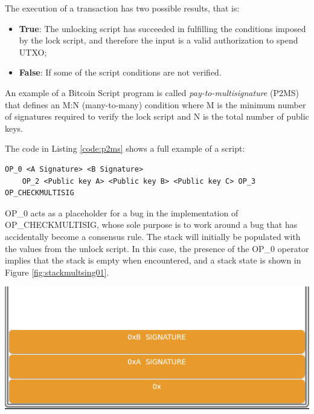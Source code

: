 The execution of a transaction has two possible results, that is: 

\begin{itemize}
    \item {\bf True}: The unlocking script has succeeded in fulfilling the 
        conditions imposed by the lock script, 
        and therefore the input is a valid authorization to spend UTXO;
    \item {\bf False}: If some of the script conditions are not verified.
\end{itemize}

\begin{example}\label{ex:p2ms_example}
    An example of a Bitcoin Script program is called \emph{pay-to-multisignature} (P2MS)
    that defines an M:N (many-to-many) condition where M is the minimum number of signatures required 
    to verify the lock script and N is the total number of public keys. 

    The code in Listing \ref{code:p2ms} shows a full example of a script:

    \begin{lstlisting}[language=bitcoinscript, caption={Full example of pay-to-multisignature script.}, label={code:p2ms}]
    OP_0 <A Signature> <B Signature>
    OP_2 <Public key A> <Public key B> <Public key C> OP_3 OP_CHECKMULTISIG
    \end{lstlisting}

    OP\_0 acts as a placeholder for a bug in the implementation of OP\_CHECKMULTISIG, 
    whose sole purpose is to work around a bug that has accidentally become a consensus rule. The stack 
    will initially be populated with the values from the unlock script.
    In this case, the presence of the OP\_0 operator implies that the stack is empty when encountered, and 
    a stack state is shown in Figure \ref{fig:stackmultsing01}.

    {\centering
    \vspace{15pt}
    \includegraphics[scale=0.35]{imgs/script/multisig/1.png}
    \vspace{10pt}
    \par}


\end{example}
